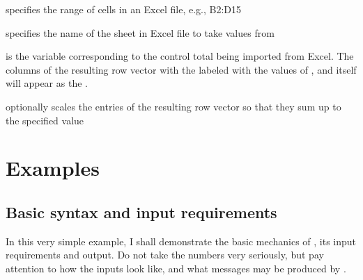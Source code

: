 \hangpara
       specifies the range of cells in an Excel file, e.g., B2:D15

\hangpara
     specifies the name of the sheet in Excel file to take values from
    
\hangpara
     is the variable corresponding to the control total being
    imported from Excel. The columns of the resulting row vector with the
    labeled with the values of \varname, and \varname itself will appear
    as the .
    
\hangpara
     optionally scales the entries of 
    the resulting row vector so that they sum up to the specified value





\section{Examples}

\subsection{Basic syntax and input requirements}

In this very simple example, I shall demonstrate the basic mechanics of
, its input requirements and output. Do not take the numbers
very seriously, but pay attention to how the inputs look like, and what
messages may be produced by .


